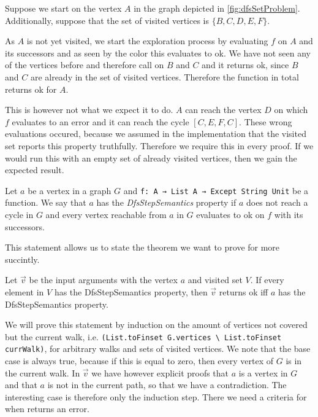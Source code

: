 \begin{example}
  Suppose we start \dfsstep on the vertex $A$ in the graph depicted in \cref{fig:dfsSetProblem}. Additionally, suppose that the set of visited vertices is $\{B,C,D,E,F\}$. 
  
  As $A$ is not yet visited, we start the exploration process by evaluating $f$ on $A$ and its successors and as seen by the color this evaluates to ok. We have not seen any of the vertices before and therefore call \dfsstep on $B$ and $C$ and it returns ok, since $B$ and $C$ are already in the set of visited vertices. Therefore the function in total returns ok for $A$.

  This is however not what we expect it to do. $A$ can reach the vertex $D$ on which $f$ evaluates to an error and it can reach the cycle $[C,E,F,C]$. These wrong evaluations occured, because we assumed in the implementation that the visited set reports this property truthfully. Therefore we require this in every proof. If we would run this with an empty set of already visited vertices, then we gain the expected result.
\end{example}

\begin{definition}
  Let $a$ be a vertex in a graph $G$ and \lstinline|f: A → List A → Except String Unit| be a function. We say that $a$ has the \textit{DfsStepSemantics} property if $a$ does not reach a cycle in $G$ and every vertex reachable from $a$ in $G$ evaluates to ok on $f$ with its successors.
\end{definition}

This statement allows us to state the theorem we want to prove for \dfsstep more succintly.

\begin{theorem}[\dfsstepsematics]
  Let $\vec{v}$ be the input arguments with the vertex $a$ and visited set $V$. If every element in $V$ has the DfsStepSemantics property, then \dfsstep $\vec{v}$ returns ok iff $a$ has the DfsStepSemantics property.
\end{theorem}

We will prove this statement by induction on the amount of vertices not covered but the current walk, i.e. \lstinline|(List.toFinset G.vertices \ List.toFinset currWalk)|, for arbitrary walks and sets of visited vertices. We note that the base case is always true, because if this is equal to zero, then every vertex of $G$ is in the current walk. In $\vec{v}$ we have however explicit proofs that $a$ is a vertex in $G$ and that $a$ is not in the current path, so that we have a contradiction. The interesting case is therefore only the induction step. There we need a criteria for when \foldlexceptset returns an error.

